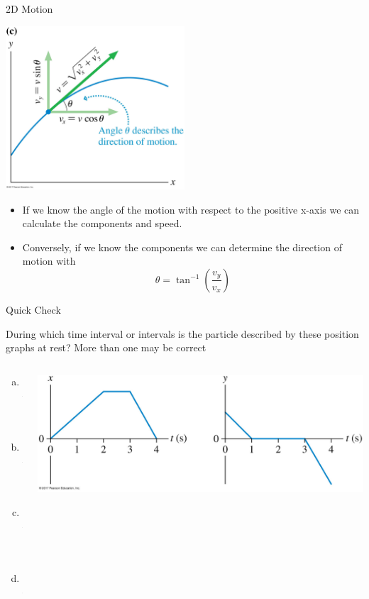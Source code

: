 \documentclass{beamer}
\newcommand{\red}[1]{{\color{red}{#1}}}
\newcommand{\checkl}[2]{\begin{textblock*}{1cm}(#1,#2){\large \red{\Checkmark}}\end{textblock*}}
\begin{document}
\begin{frame}{2D Motion}
\begin{center}
   \includegraphics[width=0.5\textwidth]{../figures/04_02_FigureC.jpg}
\end{center}
\begin{itemize}
   \item If we know the angle of the motion with respect to the positive x-axis we can calculate the components and speed.
   \item Conversely, if we know the components we can determine the direction of motion with
   \begin{equation*}
      \theta = \tan^{-1}\left(\frac{v_y}{v_x}\right)
   \end{equation*}
\end{itemize}
\end{frame}

\begin{frame}{Quick Check}
\begin{center}
   During which time interval or intervals is the particle described by these position graphs at rest? More than one may be correct
   \begin{columns}
   \begin{column}{0.15\textwidth}
   \begin{enumerate}[a.]
      \item 0-1 s
      \item 1-2 s
      \item 2-3 s
      \item 3-4 s
   \end{enumerate}
   \end{column}
   \begin{column}{0.85\textwidth}
      \includegraphics[width=\textwidth]{../figures/Figure_STT4_1.jpg}
   \end{column}
   \end{columns}
\end{center}
\only<2>{\checkl{0.3cm}{5.2cm}}
\end{frame}
\end{document}
